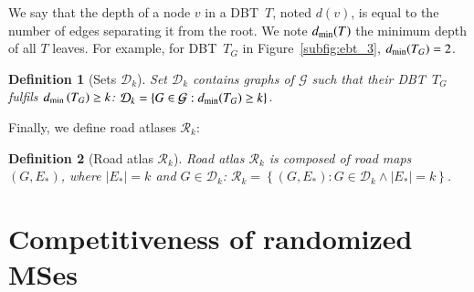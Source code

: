 \documentclass[preprint]{elsarticle}
\newtheorem{definition}{Definition}
\newcommand{\set}[1]{\left\{ #1 \right\}}
\newcommand{\card}[1]{\left| #1 \right|}
\newcommand{\mcalg}{\mathcal{G}}
\newcommand{\mcalr}{\mathcal{R}}
\newcommand{\mcald}{\mathcal{D}}
\newcommand{\mts}{MS}
\newcommand{\ebt}{DBT}
\newcommand{\dmin}{d_{\mbox{\scriptsize{min}}}}
\begin{document}

We say that the depth of a node $v$ in a \ebt ~$T$, noted $d(v)$, is equal to the number of edges separating it from the root.
We note $\dmin(T)$ the minimum depth of all $T$ leaves. For example, for \ebt ~$T_G$ in Figure~\ref{subfig:ebt_3}, $\dmin(T_G) = 2$. 

\begin{definition}[Sets $\mcald_k$]
Set $\mcald_k$ contains graphs of $\mcalg$ such that their \ebt ~$T_G$ fulfils $\dmin\left(T_G\right) \geq k$: $\mcald_k = \set{G \in \mcalg : \dmin(T_G) \geq k}$. 
\end{definition}

Finally, we define road atlases $\mcalr_k$:

\begin{definition}[Road atlas $\mcalr_k$]
Road atlas $\mcalr_k$ is composed of road maps\\ $\left(G,E_*\right)$, where $\card{E_*} = k$ and $G \in \mcald_k$: $\mcalr_k = \set{\left(G ,E_*\right): G \in \mcald_k \land \card{E_*} = k}$.
\label{def:roadatlas}
\end{definition}


\section{Competitiveness of randomized \mts es} \label{sec:competitiveness}
\end{document}
